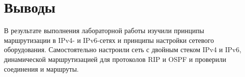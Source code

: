   \section{Выводы}
  В результате выполнения лабораторной работы изучили принципы маршрутизации в IPv4- и IPv6-сетях и принципы настройки сетевого оборудования. Самостоятельно настроили сеть с двойным стеком IPv4 и IPv6, динамической маршрутизацией для протоколов RIP и OSPF и проверили соединения и маршруты.

